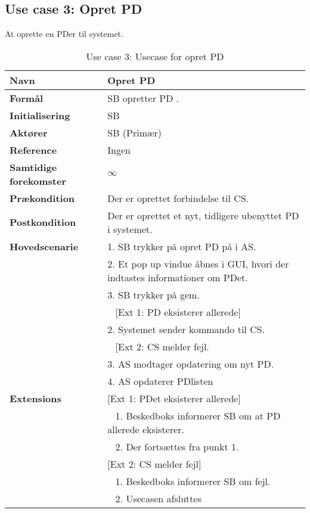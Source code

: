 \subsection{Use case 3: Opret \gls{PD}} \label{prodkat}
At oprette en \gls{PD}er til systemet.



\begin{table}[H]
\begin{tabularx}{\textwidth}{|l|X|}
\hline
\textbf{Navn}					& Opret \gls{PD} \\\hline
\textbf{Formål}					& \gls{SB} opretter \gls{PD} . \\\hline
\textbf{Initialisering}			& \gls{SB} \\\hline
\textbf{Aktører}				& \gls{SB} (Primær)\\\hline
\textbf{Reference}				& Ingen \\\hline
								
\textbf{Samtidige forekomster}	& $\infty$ \\\hline
\textbf{Prækondition}			& Der er oprettet forbindelse til \gls{CS}.
\\\hline
\textbf{Postkondition}			& Der er oprettet et nyt, tidligere ubenyttet \gls{PD} i systemet.
\\\hline
\textbf{Hovedscenarie}			& 1. \gls{SB} trykker på opret \gls{PD} på i \gls{AS}.\\												& 2. Et pop up vindue åbnes i \gls{GUI}, hvori der indtastes informationer om \gls{PD}et.\\
								& 3. \gls{SB} trykker på gem.\\
								& ~ [Ext 1: \gls{PD} eksisterer allerede] \\
								& 2. Systemet sender kommando til \gls{CS}.\\
								& ~ [Ext 2: \gls{CS} melder fejl.\\
								& 3. \gls{AS} modtager opdatering om nyt \gls{PD}. \\
								& 4. \gls{AS} opdaterer \gls{PD}listen \\\hline

\textbf{Extensions}						
								& [Ext 1: \gls{PD}et eksisterer allerede] \\
								& ~ 1. Beskedboks informerer \gls{SB} om at \gls{PD} allerede eksisterer.\\
								& ~ 2. Der fortsættes fra punkt 1.\\
									
								& [Ext 2: \gls{CS} melder fejl] \\
								& ~ 1. Beskedboks informerer \gls{SB} om fejl. \\
								& ~ 2. Usecasen afsluttes \\\hline
\end{tabularx}
\caption{Use case 3: Usecase for opret \gls{PD} }
\label{tab:UCop}
\end{table}
